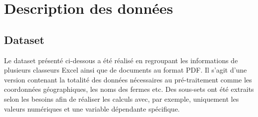 \appendix

\chapter{Description des données}
\label{annexeDataset}
\section{Dataset}
Le dataset présenté ci-dessous a été réalisé en regroupant les informations de plusieurs classeurs Excel ainsi que de documents au format PDF. Il s'agit d'une version contenant la totalité des données nécessaires au pré-traitement comme les coordonnées géographiques, les noms des fermes etc. Des sous-sets ont été extraits selon les besoins afin de réaliser les calculs avec, par exemple, uniquement les valeurs numériques et une variable dépendante spécifique. 



